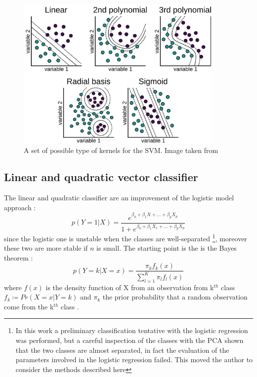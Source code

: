 \documentclass[
12pt, %
a4paper, %
oneside, %
headinclude,footinclude, %
BCOR5mm, %
]{scrartcl}
\begin{document}
\begin{figure}[h]
\begin{center}
\includegraphics[width=0.9\textwidth]{Pic/Kernels_Type.png}
\caption{A set of possible type of kernels for the SVM. Image taken from \cite{ker_svm}}
\label{SVM_kernels}
\end{center}
\end{figure}
\subsection{Linear and quadratic vector classifier}
The linear and quadratic classifier are an improvement of the logistic model approach \cite{james2013introduction}: 
\begin{equation}
p(Y=1|X)=\dfrac{e^{\beta_{0}+\beta_{1}X+...+\beta_{p}X_{p}}}{1+e^{\beta_{0}+\beta_{1}X_{1}+...+\beta_{p}X_{p}}}
\end{equation}
since the logistic one is unstable when the classes are well-separated \footnote{In this work a preliminary classification tentative with the logistic regression was performed, but a careful inspection of the classes with the PCA shown that the two classes are almost separated, in fact the evaluation of the parameters involved in the logistic regression failed. This moved the author to consider the methods described here}, moreover these two are more stable if $n$ is small. The starting point is the is the Bayes theorem \cite{james2013introduction}:
\begin{equation}
p(Y=k|X=x)=\dfrac{\pi_{k}f_{k}(x)}{\sum_{l=1}^{K}\pi_{l}f_{l}(x)}
\end{equation}
where $f(x)$ is the density function of X from an observation from k$^{th}$ class  $f_{k}\coloneqq Pr(X=x|Y=k)$ and $\pi_{k}$ the prior probability that a random observation come from the k$^{th}$ class \cite{james2013introduction}. 
\end{document}
